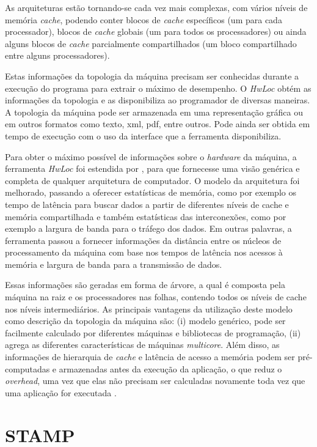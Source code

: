 \documentclass[diss,capa]{texufpel}
\begin{document}
As arquiteturas estão tornando-se cada vez mais complexas, com vários níveis de memória \emph{cache}, podendo conter blocos de \emph{cache} específicos (um para cada processador), blocos de \emph{cache} globais (um para todos os processadores) ou ainda alguns blocos de \emph{cache} parcialmente compartilhados (um bloco compartilhado entre alguns processadores).

Estas informações da topologia da máquina precisam ser conhecidas durante a execução do programa para extrair o máximo de desempenho. O \emph{HwLoc} obtém as informações da topologia e as disponibiliza ao programador de diversas maneiras. A topologia da máquina pode ser armazenada em uma representação gráfica ou em outros formatos como texto, xml, pdf, entre outros. Pode ainda ser obtida em tempo de execução com o uso da interface que a ferramenta disponibiliza.

Para obter o máximo possível de informações sobre o \emph{hardware} da máquina, a ferramenta \emph{HwLoc} foi estendida por \cite{Pilla_laercio2014}, para que fornecesse uma visão genérica e completa de qualquer arquitetura de computador. O modelo da arquitetura foi melhorado, passando a oferecer estatísticas de memória, como por exemplo os tempo de latência para buscar dados a partir de diferentes níveis de cache e memória compartilhada e também estatísticas das interconexões, como por exemplo a largura de banda para o tráfego dos dados. Em outras palavras, a ferramenta passou a fornecer informações da distância entre os núcleos de processamento da máquina com base nos tempos de latência nos acessos à memória e largura de banda para a transmissão de dados.

Essas informações são geradas em forma de árvore, a qual é composta pela máquina na raiz e os processadores nas folhas, contendo todos os níveis de cache nos níveis intermediários. As principais vantagens da utilização deste modelo como descrição da topologia da máquina são: (i) modelo genérico, pode ser facilmente calculado por diferentes máquinas e bibliotecas de programação, (ii) agrega as diferentes características de máquinas \emph{multicore}. Além disso, as informações de hierarquia de \emph{cache} e latência de acesso a memória podem ser pré-computadas e armazenadas antes da execução da aplicação, o que reduz o \emph{overhead}, uma vez que elas não precisam ser calculadas novamente toda vez que uma aplicação for executada \cite{Pilla_laercio2014}.

\chapter{STAMP}
\label{chapter::benchmark}
\end{document}

